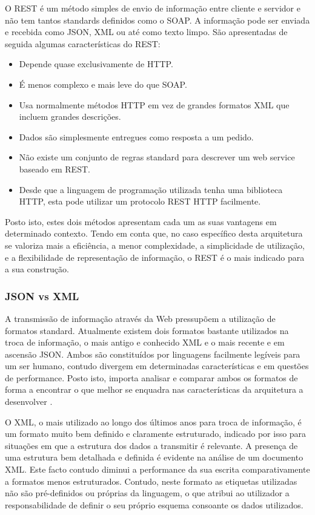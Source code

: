 O REST é um método simples de envio de informação entre cliente e servidor e não tem tantos standards definidos como o SOAP. A informação pode ser enviada e recebida como JSON, XML ou até como texto limpo. São apresentadas de seguida algumas características do REST:
\begin{itemize}
	\item Depende quase exclusivamente de HTTP.
	\item É menos complexo e mais leve do que SOAP.
	\item Usa normalmente métodos HTTP em vez de grandes formatos XML que incluem grandes descrições.
	\item Dados são simplesmente entregues como resposta a um pedido.
	\item Não existe um conjunto de regras standard para descrever um web service baseado em REST.
	\item Desde que a linguagem de programação utilizada tenha uma biblioteca HTTP, esta pode utilizar um protocolo REST HTTP facilmente.
\end{itemize}

Posto isto, estes dois métodos apresentam cada um as suas vantagens em determinado contexto. Tendo em conta que, no caso específico desta arquitetura se valoriza mais a eficiência, a menor complexidade, a simplicidade de utilização, e a flexibilidade de representação de informação, o REST é o mais indicado para a sua construção. 

\subsubsection{JSON vs XML}

A transmissão de informação através da Web pressupõem a utilização de formatos standard. Atualmente existem dois formatos bastante utilizados na troca de informação, o mais antigo e conhecido XML e o mais recente e em ascensão JSON. Ambos são constituídos por linguagens facilmente legíveis para um ser humano, contudo divergem em determinadas características e em questões de performance. Posto isto, importa analisar e comparar ambos os formatos de forma a encontrar o que melhor se enquadra nas características da arquitetura a desenvolver \cite{nurseitov2009comparison}.

O XML, o mais utilizado ao longo dos últimos anos para troca de informação, é um formato muito bem definido e claramente estruturado, indicado por isso para situações em que a estrutura dos dados a transmitir é relevante. A presença de uma estrutura bem detalhada e definida é evidente na análise de um documento XML. Este facto contudo diminui a performance da sua escrita comparativamente a formatos menos estruturados. Contudo, neste formato as etiquetas utilizadas não são pré-definidos ou próprias da linguagem, o que atribui ao utilizador a responsabilidade de definir o seu próprio esquema consoante os dados utilizados.


